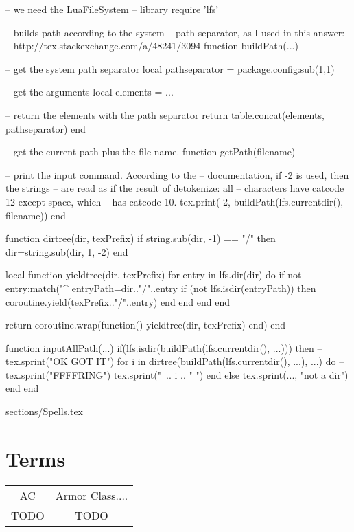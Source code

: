 \documentclass[18pt]{article}
\begin{document}
\begin{luacode}
-- we need the LuaFileSystem
-- library
require 'lfs'

-- builds path according to the system
-- path separator, as I used in this answer:
-- http://tex.stackexchange.com/a/48241/3094
function buildPath(...)

    -- get the system path separator
    local pathseparator = package.config:sub(1,1)

    -- get the arguments
    local elements = {...}

    -- return the elements with the path separator
    return table.concat(elements, pathseparator)
end


-- get the current path plus the file name.
function getPath(filename)

    -- print the input command. According to the
    -- documentation, if -2 is used, then the strings
    -- are read as if the result of detokenize: all
    -- characters have catcode 12 except space, which
    -- has catcode 10.
    tex.print(-2, buildPath(lfs.currentdir(), filename))
end

function dirtree(dir, texPrefix)
  if string.sub(dir, -1) == "/" then
    dir=string.sub(dir, 1, -2)
  end

  local function yieldtree(dir, texPrefix)
    for entry in lfs.dir(dir) do
      if not entry:match("^%
        entryPath=dir.."/"..entry
          if (not lfs.isdir(entryPath)) then
            coroutine.yield(texPrefix.."/"..entry)
          end
      end
    end
  end

  return coroutine.wrap(function() yieldtree(dir, texPrefix) end)
end


function inputAllPath(...)
    if(lfs.isdir(buildPath(lfs.currentdir(), ...))) then
	--tex.sprint("OK GOT IT")
        for i in dirtree(buildPath(lfs.currentdir(), ...), ...) do
           --tex.sprint("FFFFRING")
           tex.sprint("\ ..  i .. " ")
        end
    else
        tex.sprint({...}, "not a dir")
    end
end
\end{luacode}

\newcommand\fullpath[1]{\luadirect{getPath(\luastring{#1})}}
\newcommand\inputAll[1]{\luadirect{inputAllPath(\luastring{#1})}}




\inputAll{sections/classes}





 {sections/Spells.tex}







\appendix
\section*{Terms}
\begin{tabular}{c c}

AC & Armor Class.... \\

TODO & TODO \\

\end{tabular}
\end{document}
